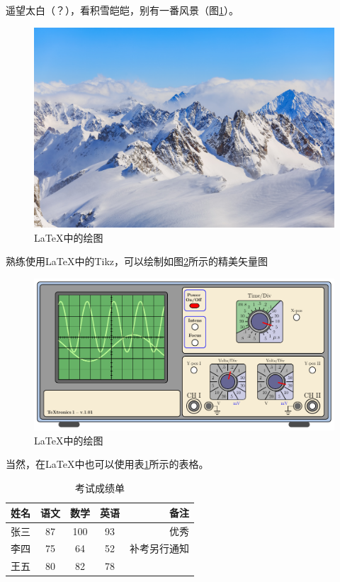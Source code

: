 \documentclass{ctexart}
\begin{document}
    遥望太白（？），看积雪皑皑，别有一番风景（图\ref{fig-mountain}）。
    \begin{figure}[htbp]  %
        \centering
        \includegraphics[scale=0.03]{mountain}
        \caption{\LaTeX 中的绘图}\label{fig-mountain}
    \end{figure}

    熟练使用\LaTeX 中的Tikz，可以绘制如图\ref{fig=tikz}所示的精美矢量图
    \begin{figure}[htbp]
        \centering
        \includegraphics[scale=0.3]{oscilloscope}
        \caption{\LaTeX 中的绘图}\label{fig=tikz}
    \end{figure}

    当然，在\LaTeX {}中也可以使用表\ref{tab-score}所示的表格。
    \begin{table}[h]
        \centering
        \caption{考试成绩单}\label{tab-score}
        \begin{tabular}{|l|c|c|c|r|}
            \hline
            姓名 & 语文 & 数学 & 英语 & 备注 \\
            \hline
            张三 & 87 & 100 & 93 & 优秀 \\
            \hline
            李四 & 75 & 64 & 52 & 补考另行通知 \\
            \hline
            王五 & 80 & 82 & 78 & \\
            \hline
        \end{tabular}
    \end{table}
\end{document}
